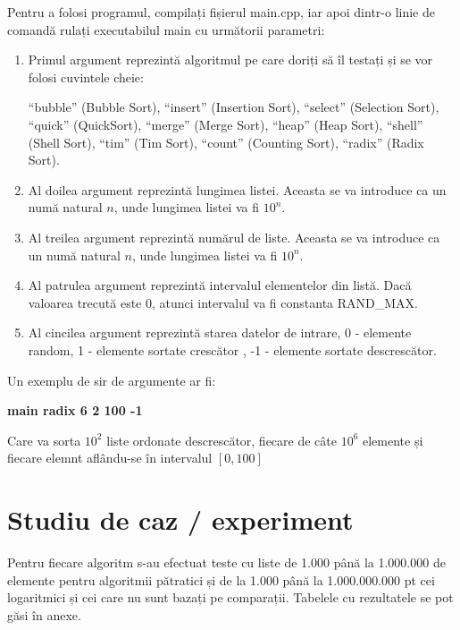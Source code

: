 \documentclass[12pt]{article}
\begin{document}
Pentru a folosi programul, compilați fișierul main.cpp, iar apoi dintr-o linie de comandă rulați executabilul
main cu următorii parametri:

\begin{enumerate}
    \item Primul argument reprezintă algoritmul pe care doriți să îl testați și se vor folosi cuvintele cheie:
    
    ``bubble'' (Bubble Sort), ``insert'' (Insertion Sort), ``select'' (Selection Sort), ``quick'' (QuickSort),
    ``merge'' (Merge Sort), ``heap'' (Heap Sort), ``shell'' (Shell Sort), ``tim'' (Tim Sort), ``count'' (Counting Sort),
    ``radix'' (Radix Sort).

    \item Al doilea argument reprezintă lungimea listei. Aceasta se va introduce ca un numă natural $n$, unde lungimea listei
    va fi $10^n$.

    \item Al treilea argument reprezintă numărul de liste. Aceasta se va introduce ca un numă natural $n$, unde lungimea listei
    va fi $10^n$.

    \item Al patrulea argument reprezintă intervalul elementelor din listă. Dacă valoarea trecută este 0,
    atunci intervalul va fi constanta RAND\_MAX.

    \item Al cincilea argument reprezintă starea datelor de intrare, 0 - elemente random, 1 - elemente sortate crescător
    , -1 - elemente sortate descrescător. 

\end{enumerate}

Un exemplu de sir de argumente ar fi:\newline

{\bf main radix 6 2 100 -1} \newline

Care va sorta $10^2$ liste ordonate descrescător, fiecare de câte $10^6$ elemente și fiecare elemnt aflându-se în intervalul $[0, 100]$


\section{Studiu de caz / experiment}

Pentru fiecare algoritm s-au efectuat teste cu liste de 1.000 până la 1.000.000 de elemente pentru algoritmii
pătratici și de la 1.000 până la 1.000.000.000 pt cei logaritmici și cei care nu sunt bazați pe comparații.
Tabelele cu rezultatele se pot găsi în anexe.
\end{document}
